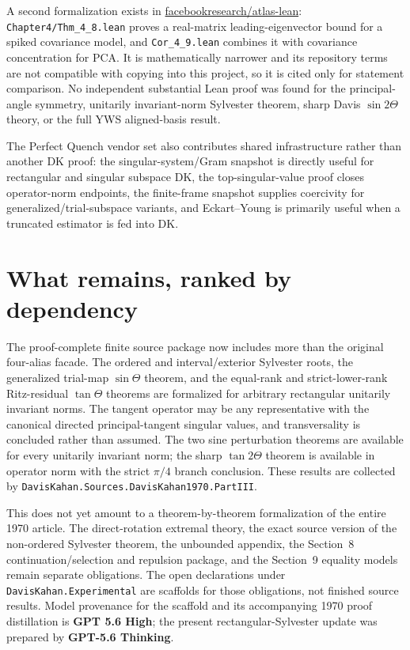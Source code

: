 \documentclass[11pt]{article}
\theoremstyle{remark}
\begin{document}
A second formalization exists in
\href{https://github.com/facebookresearch/atlas-lean}{facebookresearch/atlas-lean}:
\texttt{Chapter4/Thm\_4\_8.lean} proves a real-matrix leading-eigenvector bound for a
spiked covariance model, and \texttt{Cor\_4\_9.lean} combines it with covariance
concentration for PCA.  It is mathematically narrower and its repository terms are not
compatible with copying into this project, so it is cited only for statement comparison.
No independent substantial Lean proof was found for the principal-angle symmetry,
unitarily invariant-norm Sylvester theorem, sharp Davis $\sin 2\Theta$ theory, or the full
YWS aligned-basis result.

The Perfect Quench vendor set also contributes shared infrastructure rather than another DK
proof: the singular-system/Gram snapshot is directly useful for rectangular and singular
subspace DK, the top-singular-value proof closes operator-norm endpoints, the finite-frame
snapshot supplies coercivity for generalized/trial-subspace variants, and Eckart--Young is
primarily useful when a truncated estimator is fed into DK.

\section{What remains, ranked by dependency}\label{sec:remains}

The proof-complete finite source package now includes more than the
original four-alias facade.  The ordered and interval/exterior Sylvester roots,
the generalized trial-map $\sin\Theta$ theorem, and the equal-rank and
strict-lower-rank Ritz-residual $\tan\Theta$ theorems are formalized for
arbitrary rectangular unitarily invariant norms.  The tangent operator may be
any representative with the canonical directed principal-tangent singular
values, and transversality is concluded rather than assumed.  The two sine
perturbation theorems are available for every unitarily invariant norm; the
sharp $\tan2\Theta$ theorem is available in operator norm with the strict
$\pi/4$ branch conclusion.  These results are collected by
\texttt{DavisKahan.Sources.DavisKahan1970.PartIII}.

This does not yet amount to a theorem-by-theorem formalization of the entire
1970 article.  The direct-rotation extremal theory, the exact source version of
the non-ordered Sylvester theorem, the unbounded appendix, the Section~8
continuation/selection and repulsion package, and the Section~9 equality models
remain separate obligations.  The open declarations under
\texttt{DavisKahan.Experimental} are scaffolds for those obligations, not
finished source results.  Model provenance for the scaffold and its
accompanying 1970 proof distillation is \textbf{GPT 5.6 High}; the present
rectangular-Sylvester update was prepared by \textbf{GPT-5.6 Thinking}.
\end{document}
